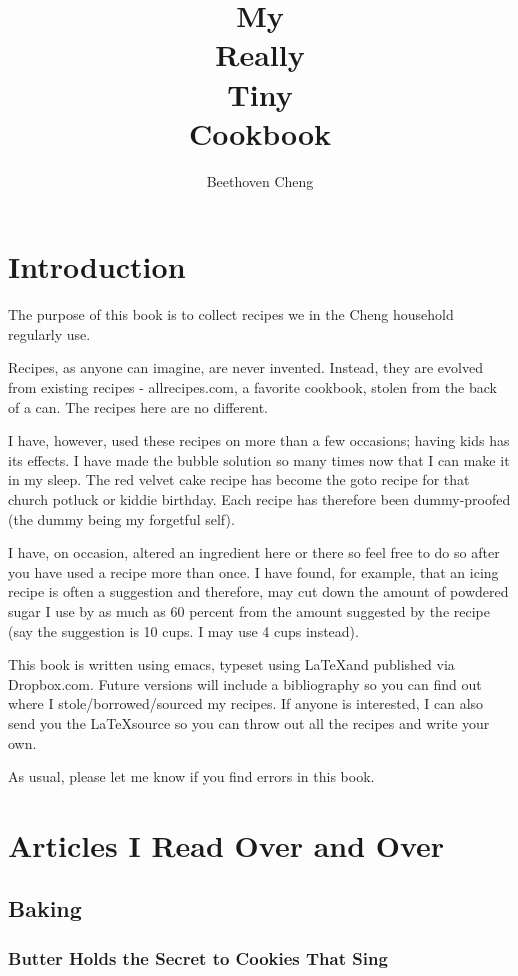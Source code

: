 \documentclass[12pt,landscape,twoside,twocolumn, openright, titlepage, draft]{book}
\title{My\\Really\\Tiny\\Cookbook}
\author{Beethoven Cheng}
\begin{document}
\maketitle
%
\tableofcontents
\chapter{Introduction}

The purpose of this book is to collect recipes we in the Cheng household regularly use.

Recipes, as anyone can imagine, are never invented. Instead, they are evolved from existing recipes - allrecipes.com, a favorite cookbook, stolen from the back of a can. The recipes here are no different.

I have, however, used these recipes on more than a few occasions; having kids has its effects. I have made the bubble solution so many times now that I can make it in my sleep. The red velvet cake recipe has become the goto recipe for that church potluck or kiddie birthday. Each recipe has therefore been dummy-proofed (the dummy being my forgetful self).

I have, on occasion, altered an ingredient here or there so feel free to do so after you have used a recipe more than once. I have found, for example, that an icing recipe is often a suggestion and therefore, may cut down the amount of powdered sugar I use by as much as 60 percent from the amount suggested by the recipe (say the suggestion is 10 cups. I may use 4 cups instead).

This book is written using emacs, typeset using \LaTeX and published via Dropbox.com. Future versions will include a bibliography so you can find out where I stole/borrowed/sourced my recipes. If anyone is interested, I can also send you the \LaTeX source so you can throw out all the recipes and write your own.

As usual, please let me know if you find errors in this book.

\chapter{Articles I Read Over and Over}

\section{Baking}

\subsection{Butter Holds the Secret to Cookies That Sing}
\end{document}
